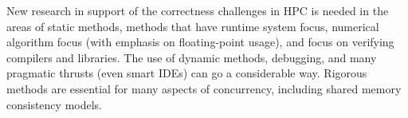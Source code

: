 \begin{WrapText}
\footnotesize
 
 New research in support of
 the correctness challenges in
 HPC is needed in the areas
 of static methods, methods that
have runtime system focus, 
numerical algorithm focus (with
emphasis on floating-point usage),
and focus on verifying compilers
and libraries.
The use of dynamic methods, debugging,
and many pragmatic thrusts (even smart
IDEs) can go a considerable way.
Rigorous methods are essential for
many aspects of concurrency, including
shared memory consistency models.

\end{WrapText}